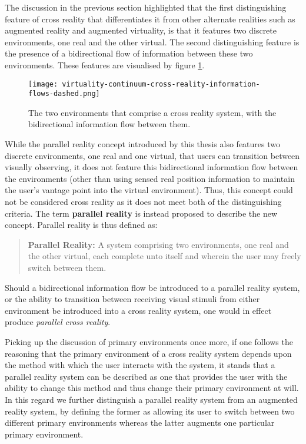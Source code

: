 The discussion in the previous section highlighted that the first distinguishing feature of cross reality that differentiates it from other alternate realities such as augmented reality and augmented virtuality, is that it features two discrete environments, one real and the other virtual. The second distinguishing feature is the presence of a bidirectional flow of information between these two environments. These features are visualised by figure \ref{virtuality-continuum-cross-reality-information-flows-dashed.png}.

\begin{figure}[h]
	\begin{center}
		\texttt{[image: virtuality-continuum-cross-reality-information-flows-dashed.png]}
		\caption{The two environments that comprise a cross reality system, with the bidirectional information flow between them.}
		\label{virtuality-continuum-cross-reality-information-flows-dashed.png}
	\end{center}
\end{figure}

While the parallel reality concept introduced by this thesis also features two discrete environments, one real and one virtual, that users can transition between visually observing, it does not feature this bidirectional information flow between the environments (other than using sensed real position information to maintain the user's vantage point into the virtual environment). Thus, this concept could not be considered cross reality as it does not meet both of the distinguishing criteria. The term \textbf{parallel reality} is instead proposed to describe the new concept. Parallel reality is thus defined as:

\begin{quote}
	\textbf{Parallel Reality:} A system comprising two environments, one real and the other virtual, each complete unto itself and wherein the user may freely switch between them.
\end{quote}

Should a bidirectional information flow be introduced to a parallel reality system, or the ability to transition between receiving visual stimuli from either environment be introduced into a cross reality system, one would in effect produce \textit{parallel cross reality}.

Picking up the discussion of primary environments once more, if one follows the reasoning that the primary environment of a cross reality system depends upon the method with which the user interacts with the system, it stands that a parallel reality system can be described as one that provides the user with the ability to change this method and thus change their primary environment at will. In this regard we further distinguish a parallel reality system from an augmented reality system, by defining the former as allowing its user to switch between two different primary environments whereas the latter augments one particular primary environment.

